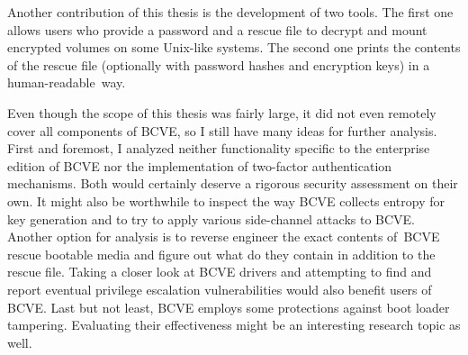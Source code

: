\documentclass[thesis=B,english]{FITthesis}[2012/10/20]
\begin{document}
	Another contribution of this thesis is the development of two tools. The first one allows users who provide a password and a rescue file to decrypt and mount encrypted volumes on some Unix-like systems. The second one prints the contents of the rescue file (optionally with password hashes and encryption keys) in a human-readable~way.

	Even though the scope of this thesis was fairly large, it did not even remotely cover all components of BCVE, so I still have many ideas for further analysis. First and foremost, I analyzed neither functionality specific to the enterprise edition of BCVE nor the implementation of two-factor authentication mechanisms. Both would certainly deserve a rigorous security assessment on their own. It might also be worthwhile to inspect the way BCVE collects entropy for key generation and to try to apply various side-channel attacks to BCVE. Another option for analysis is to reverse engineer the exact contents of~BCVE rescue bootable media and figure out what do they contain in addition to the rescue file. Taking a closer look at BCVE drivers and attempting to find and report eventual privilege escalation vulnerabilities would also benefit users of BCVE. Last but not least, BCVE employs some protections against boot loader tampering. Evaluating their effectiveness might be an interesting research topic as well.
	
	
	
	
	\appendix
	
\end{document}
